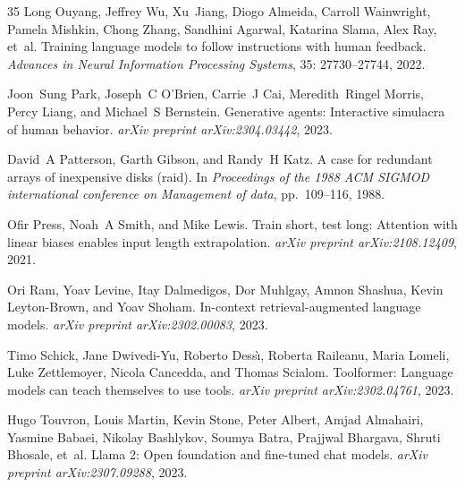 \documentclass[UTF8,fontset=fandol,a4paper,11pt]{ctexart}
\begin{document}
\begin{thebibliography}{35}
Long Ouyang, Jeffrey Wu, Xu~Jiang, Diogo Almeida, Carroll Wainwright, Pamela Mishkin, Chong Zhang, Sandhini Agarwal, Katarina Slama, Alex Ray, et~al.
\newblock Training language models to follow instructions with human feedback.
\newblock \emph{Advances in Neural Information Processing Systems}, 35: 27730--27744, 2022.

Joon~Sung Park, Joseph~C O'Brien, Carrie~J Cai, Meredith~Ringel Morris, Percy Liang, and Michael~S Bernstein.
\newblock Generative agents: Interactive simulacra of human behavior.
\newblock \emph{arXiv preprint arXiv:2304.03442}, 2023.

David~A Patterson, Garth Gibson, and Randy~H Katz.
\newblock A case for redundant arrays of inexpensive disks (raid).
\newblock In \emph{Proceedings of the 1988 ACM SIGMOD international conference on Management of data}, pp.\  109--116, 1988.

Ofir Press, Noah~A Smith, and Mike Lewis.
\newblock Train short, test long: Attention with linear biases enables input length extrapolation.
\newblock \emph{arXiv preprint arXiv:2108.12409}, 2021.

Ori Ram, Yoav Levine, Itay Dalmedigos, Dor Muhlgay, Amnon Shashua, Kevin Leyton-Brown, and Yoav Shoham.
\newblock In-context retrieval-augmented language models.
\newblock \emph{arXiv preprint arXiv:2302.00083}, 2023.

Timo Schick, Jane Dwivedi-Yu, Roberto Dess{\`\i}, Roberta Raileanu, Maria Lomeli, Luke Zettlemoyer, Nicola Cancedda, and Thomas Scialom.
\newblock Toolformer: Language models can teach themselves to use tools.
\newblock \emph{arXiv preprint arXiv:2302.04761}, 2023.

Hugo Touvron, Louis Martin, Kevin Stone, Peter Albert, Amjad Almahairi, Yasmine Babaei, Nikolay Bashlykov, Soumya Batra, Prajjwal Bhargava, Shruti Bhosale, et~al.
\newblock Llama 2: Open foundation and fine-tuned chat models.
\newblock \emph{arXiv preprint arXiv:2307.09288}, 2023.


\end{thebibliography}
\end{document}
